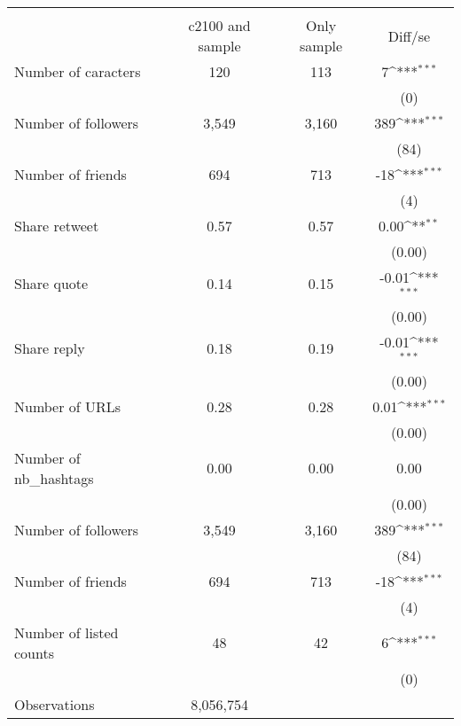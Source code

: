 {
\def\sym#1{\ifmmode^{#1}\else\(^{#1}\)\fi}
\begin{tabular}{l*{1}{ccc}}
\hline\hline
                    &\multicolumn{3}{c}{}                           \\
                    &c2100 and sample& Only sample&     Diff/se         \\
\hline
Number of caracters &         120&         113&           7\sym{***}\\
                    &            &            &         (0)         \\
Number of followers &       3,549&       3,160&         389\sym{***}\\
                    &            &            &        (84)         \\
Number of friends   &         694&         713&         -18\sym{***}\\
                    &            &            &         (4)         \\
Share retweet       &        0.57&        0.57&        0.00\sym{**} \\
                    &            &            &      (0.00)         \\
Share quote         &        0.14&        0.15&       -0.01\sym{***}\\
                    &            &            &      (0.00)         \\
Share reply         &        0.18&        0.19&       -0.01\sym{***}\\
                    &            &            &      (0.00)         \\
Number of URLs      &        0.28&        0.28&        0.01\sym{***}\\
                    &            &            &      (0.00)         \\
Number of nb\_hashtags&        0.00&        0.00&        0.00         \\
                    &            &            &      (0.00)         \\
Number of followers &       3,549&       3,160&         389\sym{***}\\
                    &            &            &        (84)         \\
Number of friends   &         694&         713&         -18\sym{***}\\
                    &            &            &         (4)         \\
Number of listed counts&          48&          42&           6\sym{***}\\
                    &            &            &         (0)         \\
\hline
Observations        &   8,056,754&            &                     \\
\hline\hline
\end{tabular}
}
